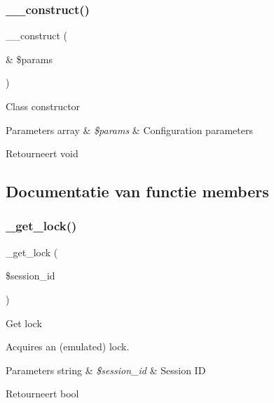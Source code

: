 \subsubsection{\texorpdfstring{\_\_construct()}{\_\_construct()}}
{\footnotesize\ttfamily \+\_\+\+\_\+construct (\begin{DoxyParamCaption}\item[{\&}]{\$params }\end{DoxyParamCaption})}

Class constructor


\begin{DoxyParams}[1]{Parameters}
array & {\em \$params} & Configuration parameters \\
\hline
\end{DoxyParams}
\begin{DoxyReturn}{Retourneert}
void 
\end{DoxyReturn}


\subsection{Documentatie van functie members}
\mbox{\label{class_c_i___session__redis__driver_a2c49c8e23be3e2aca96a9d20de18ffc2}} 
\subsubsection{\texorpdfstring{\_get\_lock()}{\_get\_lock()}}
{\footnotesize\ttfamily \+\_\+get\+\_\+lock (\begin{DoxyParamCaption}\item[{}]{\$session\+\_\+id }\end{DoxyParamCaption})\hspace{0.3cm}{\ttfamily [protected]}}

Get lock

Acquires an (emulated) lock.


\begin{DoxyParams}[1]{Parameters}
string & {\em \$session\+\_\+id} & Session ID \\
\hline
\end{DoxyParams}
\begin{DoxyReturn}{Retourneert}
bool 
\end{DoxyReturn}
\mbox{\label{class_c_i___session__redis__driver_a0265e356e6cf1eaba229663c1664c37d}} 
